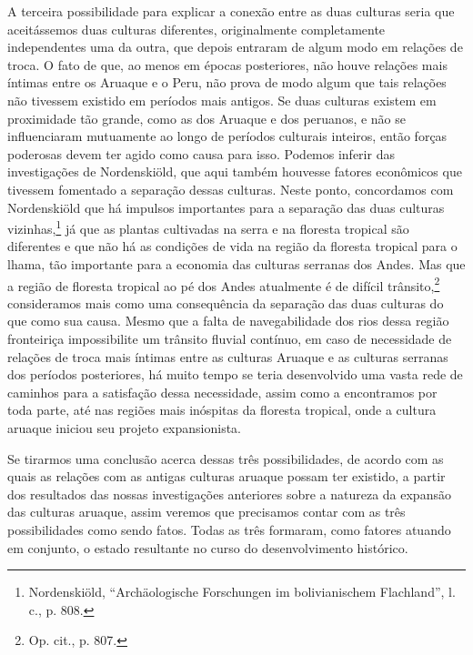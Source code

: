 A terceira possibilidade para explicar a conexão entre as duas culturas
seria que aceitássemos duas culturas diferentes, originalmente
completamente independentes uma da outra, que depois entraram de algum
modo em relações de troca. O fato de que, ao menos em épocas
posteriores, não houve relações mais íntimas entre os Aruaque e o Peru,
não prova de modo algum que tais relações não tivessem existido em
períodos mais antigos. Se duas culturas existem em proximidade tão
grande, como as dos Aruaque e dos peruanos, e não se influenciaram
mutuamente ao longo de períodos culturais inteiros, então forças
poderosas devem ter agido como causa para isso. Podemos inferir das
investigações de Nordenskiöld, que aqui também houvesse fatores
econômicos que tivessem fomentado a separação dessas culturas. Neste
ponto, concordamos com Nordenskiöld que há impulsos importantes para a
separação das duas culturas vizinhas,\footnote{Nordenskiöld,
  ``Archäologische Forschungen im bolivianischem Flachland'', l. c., p.
  808.} já que as plantas cultivadas na serra e na floresta tropical
são diferentes e que não há as condições de vida na região da floresta
tropical para o lhama, tão importante para a economia das culturas
serranas dos Andes. Mas que a região de floresta tropical ao pé dos
Andes atualmente é de difícil trânsito,\footnote{Op. cit., p. 807.}
consideramos mais como uma consequência da separação das duas culturas
do que como sua causa. Mesmo que a falta de navegabilidade dos rios
dessa região fronteiriça impossibilite um trânsito fluvial contínuo, em
caso de necessidade de relações de troca mais íntimas entre as culturas
Aruaque e as culturas serranas dos períodos posteriores, há muito tempo
se teria desenvolvido uma vasta rede de caminhos para a satisfação dessa
necessidade, assim como a encontramos por toda parte, até nas regiões
mais inóspitas da floresta tropical, onde a cultura aruaque iniciou seu
projeto expansionista.

Se tirarmos uma conclusão acerca dessas três possibilidades, de acordo
com as quais as relações com as antigas culturas aruaque possam ter
existido, a partir dos resultados das nossas investigações anteriores
sobre a natureza da expansão das culturas aruaque, assim veremos que
precisamos contar com as três possibilidades como sendo fatos. Todas as
três formaram, como fatores atuando em conjunto, o estado resultante no
curso do desenvolvimento histórico.

